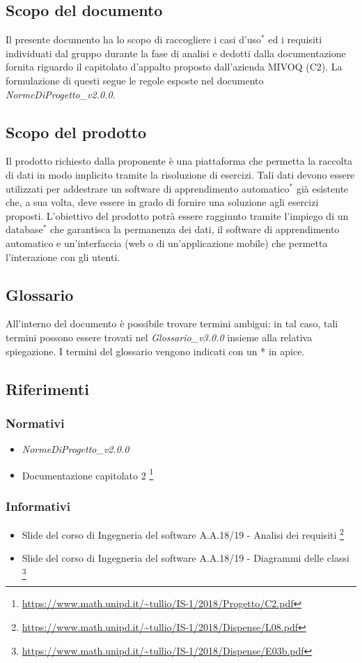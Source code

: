 \subsection{Scopo del documento}
	Il presente documento ha lo scopo di raccogliere i casi d'uso$^*$ ed i requisiti individuati dal gruppo durante la fase di analisi e dedotti dalla documentazione fornita riguardo il capitolato d'appalto proposto dall'azienda MIVOQ (C2). La formulazione di questi segue le regole esposte nel documento \textit{NormeDiProgetto\_v2.0.0}.

\subsection{Scopo del prodotto}
	Il prodotto richiesto dalla proponente è una piattaforma che permetta la raccolta di dati in modo implicito tramite la risoluzione di esercizi. Tali dati devono essere utilizzati per addestrare un software di apprendimento automatico$^*$ già esistente che, a sua volta, deve essere in grado di fornire una soluzione agli esercizi proposti. L'obiettivo del prodotto potrà essere raggiunto tramite l'impiego di un database$^*$ che garantisca la permanenza dei dati, il software di apprendimento automatico e un'interfaccia (web o di un'applicazione mobile) che permetta l'interazione con gli utenti.

\subsection{Glossario}
	All'interno del documento è possibile trovare termini ambigui: in tal caso, tali termini possono essere trovati nel \textit{Glossario_v3.0.0} insieme alla relativa spiegazione. I termini del glossario vengono indicati con un * in apice.
	
\subsection{Riferimenti}
	\subsubsection{Normativi}
	\begin{itemize}
		\item \textit{NormeDiProgetto\_v2.0.0}
		\item Documentazione capitolato 2 \footnote{\url{https://www.math.unipd.it/~tullio/IS-1/2018/Progetto/C2.pdf}}
	
	\end{itemize}
	\subsubsection{Informativi}
	\begin{itemize}
		\item Slide del corso di Ingegneria del software A.A.18/19 - Analisi dei requisiti \footnote{\url{https://www.math.unipd.it/~tullio/IS-1/2018/Dispense/L08.pdf}}
		\item Slide del corso di Ingegneria del software A.A.18/19 - Diagrammi delle classi \footnote{\url{https://www.math.unipd.it/~tullio/IS-1/2018/Dispense/E03b.pdf}}
	\end{itemize}
		